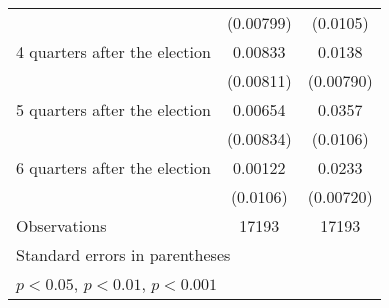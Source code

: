 \begin{table}[htbp]
\begin{tabular}{l*{2}{c}}
                    &   (0.00799)         &    (0.0105)         \\
[1em]
 4 quarters after the election&     0.00833         &      0.0138         \\
                    &   (0.00811)         &   (0.00790)         \\
[1em]
 5 quarters after the election&     0.00654         &      0.0357\sym{***}\\
                    &   (0.00834)         &    (0.0106)         \\
[1em]
 6 quarters after the election&     0.00122         &      0.0233\sym{**} \\
                    &    (0.0106)         &   (0.00720)         \\
\hline
Observations        &       17193         &       17193         \\
\hline\hline
\multicolumn{3}{l}{\footnotesize Standard errors in parentheses}\\
\multicolumn{3}{l}{\footnotesize \sym{*} \(p<0.05\), \sym{**} \(p<0.01\), \sym{***} \(p<0.001\)}\\
\end{tabular}
\end{table}
